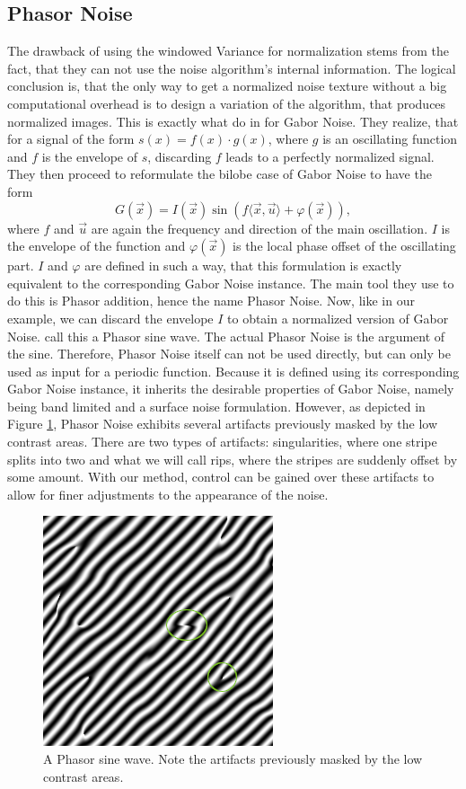 \documentclass{utue} %
\begin{document}
\subsection{Phasor Noise}\label{sec:phasorNoise}
The drawback of using the windowed Variance for normalization stems from the fact, that they can not use the noise algorithm's internal information. The logical conclusion is, that the only way to get a normalized noise texture without a big computational overhead is to design a variation of the algorithm, that produces normalized images. This is exactly what \citeauthor{phasorNoise} do in \cite{phasorNoise} for Gabor Noise. They realize, that for a signal of the form $s(x) = f(x)\cdot g(x)$, where $g$ is an oscillating function and $f$ is the envelope of $s$, discarding $f$ leads to a perfectly normalized signal. They then proceed to reformulate the bilobe case of Gabor Noise to have the form
$$
G(\vec{x}) = I(\vec{x})\sin{(f\langle\vec{x},\vec{u}\rangle + \varphi(\vec{x}))},
$$
where $f$ and $\vec{u}$ are again the frequency and direction of the main oscillation. $I$ is the envelope of the function and $\varphi(\vec{x})$ is the local phase offset of the oscillating part. $I$ and $\varphi$ are defined in such a way, that this formulation is exactly equivalent to the corresponding Gabor Noise instance. The main tool they use to do this is Phasor addition, hence the name Phasor Noise. Now, like in our example, we can discard the envelope $I$ to obtain a normalized version of Gabor Noise. \citeauthor{phasorNoise} call this a Phasor sine wave. The actual Phasor Noise is the argument of the sine. Therefore, Phasor Noise itself can not be used directly, but can only be used as input for a periodic function. Because it is defined using its corresponding Gabor Noise instance, it inherits the desirable properties of Gabor Noise, namely being band limited and a surface noise formulation. However, as depicted in Figure \ref{fig:phasorNoise}, Phasor Noise exhibits several artifacts previously masked by the low contrast areas. There are two types of artifacts: singularities, where one stripe splits into two and what we will call rips, where the stripes are suddenly offset by some amount. With our method, control can be gained over these artifacts to allow for finer adjustments to the appearance of the noise.

\begin{figure}[ht]
  \centering
  \includegraphics[width = 0.45\linewidth]{images/phasorSineWave}
  \caption{A Phasor sine wave. Note the artifacts previously masked by the low contrast areas.}\label{fig:phasorNoise}
\end{figure}
\end{document}

